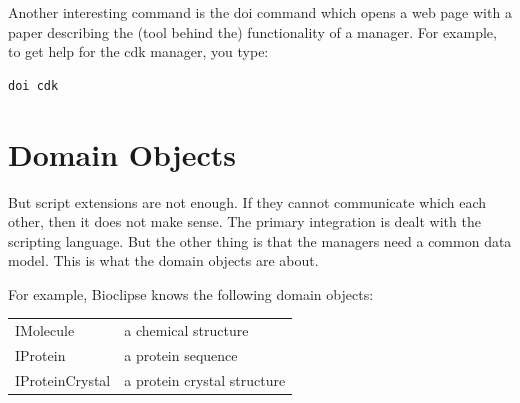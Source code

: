 \documentclass[a5paper, 10pt]{memoir}
\renewcommand{\todo}[1]{{\color{white}\oldtodo{\textsf{#1}}}}
\begin{document}
\begin{refsection}
Another interesting command is the doi command which opens a web page with a
paper describing the (tool behind the) functionality of a manager. For example,
to get help for the cdk manager, you type:

\begin{Verbatim}
doi cdk
\end{Verbatim}

\section{Domain Objects}

But script extensions are not enough. If they cannot communicate which each
other, then it does not make sense. The primary integration is dealt with the
scripting language.\todo{This is very unclear} But the other thing is that the
managers need a common data model. This is what the domain objects are
about.

For example, Bioclipse knows the following domain objects:
\vspace{0.25cm}

\begin{tabular}{ l l }
  IMolecule\index{IMolecule}\index{molecule} & a chemical structure \\
  IProtein\index{IProtein}\index{protein} & a protein sequence \\
  IProteinCrystal\index{IProteinCrystal} & a protein crystal structure \\
\end{tabular}



\printbibliography[heading=subbibliography]
\end{refsection}
\end{document}
